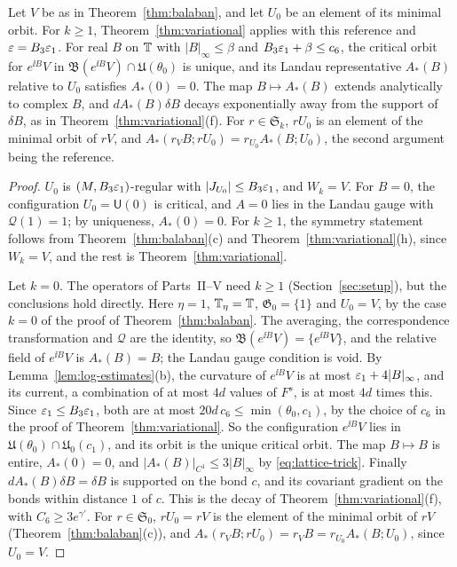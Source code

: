 \begin{corollary}\label{cor:analytic}
Let $V$ be as in Theorem~\ref{thm:balaban}, and let $U_0$ be an element of its minimal orbit. For $k\ge1$, Theorem~\ref{thm:variational} applies with this reference and $\varepsilon=B_3\varepsilon_1$. For real $B$ on $\mathbb T$ with $|B|_\infty\le\beta$ and $B_3\varepsilon_1+\beta\le c_6$, the critical orbit for $e^{\ii B}V$ in $\mathfrak B(e^{\ii B}V)\cap\mathfrak U(\theta_0)$ is unique, and its Landau representative $A_*(B)$ relative to $U_0$ satisfies $A_*(0)=0$. The map $B\mapsto A_*(B)$ extends analytically to complex $B$, and $dA_*(B)\delta B$ decays exponentially away from the support of $\delta B$, as in Theorem~\ref{thm:variational}(f). For $r\in\mathfrak S_k$, $rU_0$ is an element of the minimal orbit of $rV$, and $A_*(r_VB;rU_0)=r_{U_0}A_*(B;U_0)$, the second argument being the reference.
\end{corollary}

\begin{proof}
$U_0$ is $(M,B_3\varepsilon_1)$-regular with $|J_{U_0}|\le B_3\varepsilon_1$, and $W_k=V$. For $B=0$, the configuration $U_0=\mathsf U(0)$ is critical, and $A=0$ lies in the Landau gauge with $\mathcal Q(1)=1$; by uniqueness, $A_*(0)=0$. For $k\ge1$, the symmetry statement follows from Theorem~\ref{thm:balaban}(c) and Theorem~\ref{thm:variational}(h), since $W_k=V$, and the rest is Theorem~\ref{thm:variational}.

Let $k=0$. The operators of Parts~II--V need $k\ge1$ (Section~\ref{sec:setup}), but the conclusions hold directly. Here $\eta=1$, $\mathbb T_\eta=\mathbb T$, $\mathfrak G_0=\{1\}$ and $U_0=V$, by the case $k=0$ of the proof of Theorem~\ref{thm:balaban}. The averaging, the correspondence transformation and $\mathcal Q$ are the identity, so $\mathfrak B(e^{\ii B}V)=\{e^{\ii B}V\}$, and the relative field of $e^{\ii B}V$ is $A_*(B)=B$; the Landau gauge condition is void. By Lemma~\ref{lem:log-estimates}(b), the curvature of $e^{\ii B}V$ is at most $\varepsilon_1+4|B|_\infty$, and its current, a combination of at most $4d$ values of $F^s$, is at most $4d$ times this. Since $\varepsilon_1\le B_3\varepsilon_1$, both are at most $20d\,c_6\le\min(\theta_0,c_1)$, by the choice of $c_6$ in the proof of Theorem~\ref{thm:variational}. So the configuration $e^{\ii B}V$ lies in $\mathfrak U(\theta_0)\cap\mathfrak U_0(c_1)$, and its orbit is the unique critical orbit. The map $B\mapsto B$ is entire, $A_*(0)=0$, and $|A_*(B)|_{C^1}\le3|B|_\infty$ by \eqref{eq:lattice-trick}. Finally $dA_*(B)\delta B=\delta B$ is supported on the bond $c$, and its covariant gradient on the bonds within distance $1$ of $c$. This is the decay of Theorem~\ref{thm:variational}(f), with $C_6\ge3e^{\gamma'}$. For $r\in\mathfrak S_0$, $rU_0=rV$ is the element of the minimal orbit of $rV$ (Theorem~\ref{thm:balaban}(c)), and $A_*(r_VB;rU_0)=r_VB=r_{U_0}A_*(B;U_0)$, since $U_0=V$.
\end{proof}

